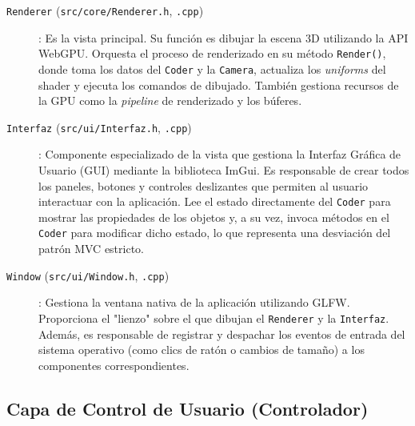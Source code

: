 \begin{description}
    \item[\texttt{Renderer} (\texttt{src/core/Renderer.h}, \texttt{.cpp})]: Es la vista principal. Su función es dibujar la escena 3D utilizando la API WebGPU. Orquesta el proceso de renderizado en su método \texttt{Render()}, donde toma los datos del \texttt{Coder} y la \texttt{Camera}, actualiza los \textit{uniforms} del shader y ejecuta los comandos de dibujado. También gestiona recursos de la GPU como la \textit{pipeline} de renderizado y los búferes.

    \item[\texttt{Interfaz} (\texttt{src/ui/Interfaz.h}, \texttt{.cpp})]: Componente especializado de la vista que gestiona la Interfaz Gráfica de Usuario (GUI) mediante la biblioteca ImGui. Es responsable de crear todos los paneles, botones y controles deslizantes que permiten al usuario interactuar con la aplicación. Lee el estado directamente del \texttt{Coder} para mostrar las propiedades de los objetos y, a su vez, invoca métodos en el \texttt{Coder} para modificar dicho estado, lo que representa una desviación del patrón MVC estricto.

    \item[\texttt{Window} (\texttt{src/ui/Window.h}, \texttt{.cpp})]: Gestiona la ventana nativa de la aplicación utilizando GLFW. Proporciona el "lienzo" sobre el que dibujan el \texttt{Renderer} y la \texttt{Interfaz}. Además, es responsable de registrar y despachar los eventos de entrada del sistema operativo (como clics de ratón o cambios de tamaño) a los componentes correspondientes.
\end{description}

\subsection{Capa de Control de Usuario (Controlador)}

